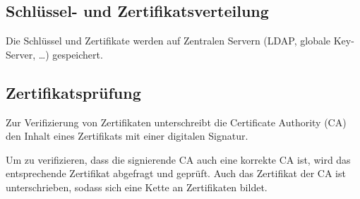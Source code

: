         \subsection{Schlüssel- und Zertifikatsverteilung}
            Die Schlüssel und Zertifikate werden auf Zentralen Servern (LDAP, globale Key-Server, \dots) gespeichert.

        \subsection{Zertifikatsprüfung}
            Zur Verifizierung von Zertifikaten unterschreibt die Certificate Authority (CA) den Inhalt eines Zertifikats mit einer digitalen Signatur.
            
            Um zu verifizieren, dass die signierende CA auch eine korrekte CA ist, wird das entsprechende Zertifikat abgefragt und geprüft. Auch das Zertifikat der CA ist unterschrieben, sodass sich eine Kette an Zertifikaten bildet.

